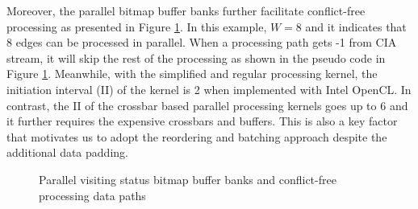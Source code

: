 Moreover, the parallel bitmap buffer banks further facilitate 
conflict-free processing as presented in Figure \ref{fig:bitmap}. 
In this example, $W = 8$ and it indicates that 8 edges can be 
processed in parallel. When a processing path gets -1 
from CIA stream, it will skip the rest of the processing as shown 
in the pseudo code in Figure \ref{fig:bitmap}.
Meanwhile, with the simplified and regular processing kernel, 
the initiation interval (II) of the kernel is 2 when implemented 
with Intel OpenCL. In contrast, the II of the crossbar based 
parallel processing kernels \cite{ham2016graphicionado} goes up to 6 
and it further requires the expensive crossbars and buffers. 
This is also a key factor that motivates us to adopt the reordering and 
batching approach despite the additional data padding.

\begin{figure}
    \caption{Parallel visiting status bitmap buffer banks and conflict-free processing data paths}
\label{fig:bitmap}
\end{figure}

%
%

